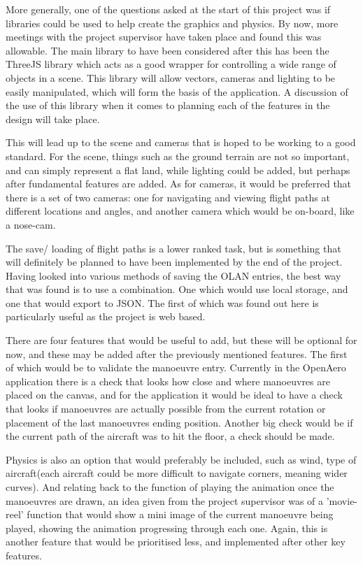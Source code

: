 More generally, one of the questions asked at the start of this project was if libraries could be used to help create the graphics and physics. By now, more meetings with the project supervisor have taken place and found this was allowable. The main library to have been considered after this has been the ThreeJS\cite{ThreeJs} library which acts as a good wrapper for controlling a wide range of objects in a scene. This library will allow vectors, cameras and lighting to be easily manipulated, which will form the basis of the application. A discussion of the use of this library when it comes to planning each of the features in the design will take place.

This will lead up to the scene and cameras that is hoped to be working to a good standard. For the scene, things such as the ground terrain are not so important, and can simply represent a flat land, while lighting could be added, but perhaps after fundamental features are added. As for cameras, it would be preferred that there is a set of two cameras: one for navigating and viewing flight paths at different locations and angles, and another camera which would be on-board, like a nose-cam.

The save/ loading of flight paths is a lower ranked task, but is something that will definitely be planned to have been implemented by the end of the project. Having looked into various methods of saving the OLAN entries, the best way that was found is to use a combination. One which would use local storage, and one that would export to JSON. The first of which was found out here\cite{Local_Storage} is particularly useful as the project is web based.

There are four features that would be useful to add, but these will be optional for now, and these may be added after the previously mentioned features. The first of which would be to validate the manoeuvre entry. Currently in the OpenAero application there is a check that looks how close and where manoeuvres are placed on the canvas, and for the application it would be ideal to have a check that looks if manoeuvres are actually possible from the current rotation or placement of the last manoeuvres ending position. Another big check would be if the current path of the aircraft was to hit the floor, a check should be made.

Physics is also an option that would preferably be included, such as wind, type of aircraft(each aircraft could be more difficult to navigate corners, meaning wider curves). And relating back to the function of playing the animation once the manoeuvres are drawn, an idea given from the project supervisor was of a 'movie-reel' function that would show a mini image of the current manoeuvre being played, showing the animation progressing through each one. Again, this is another feature that would be prioritised less, and implemented after other key features.

